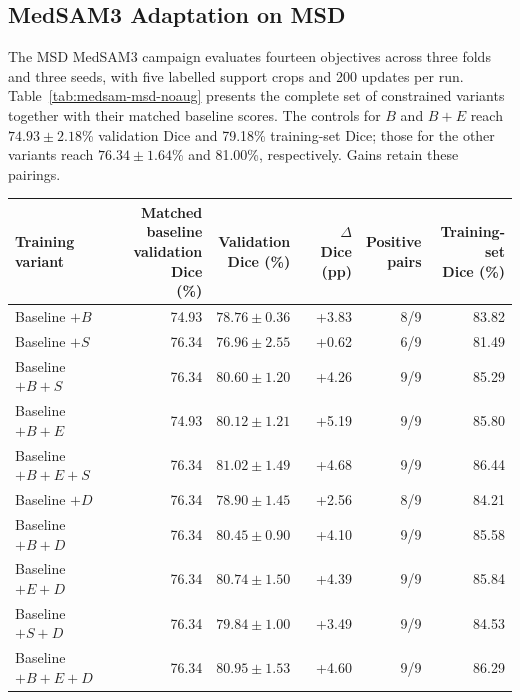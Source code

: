 \documentclass[12pt,a4paper]{article}
\begin{document}
\FloatBarrier
\subsection{MedSAM3 Adaptation on MSD}
\label{sec:medsam-results}

The MSD MedSAM3 campaign evaluates fourteen objectives across three
folds and three seeds, with five labelled support crops and 200 updates
per run. Table~\ref{tab:medsam-msd-noaug} presents the complete set of
constrained variants together with their matched baseline scores.
The controls for $B$ and $B+E$ reach $74.93\pm2.18$\% validation Dice
and 79.18\% training-set Dice; those for the other variants reach
$76.34\pm1.64$\% and 81.00\%, respectively. Gains retain these pairings.

\begin{table}[htbp]
\centering\footnotesize{}
\setlength{\tabcolsep}{4pt}
\renewcommand{\arraystretch}{1.15}
\begin{tabular}{@{}lrrrrr@{}}
\hline
\shortstack{Training\\variant} & \shortstack{Matched baseline\\validation Dice\\(\%)} & \shortstack{Validation\\Dice (\%)} & \shortstack{$\Delta$ Dice\\(pp)} & \shortstack{Positive\\pairs} & \shortstack{Training-set\\Dice (\%)} \\
\hline
Baseline $+B$ & 74.93 & $78.76\pm0.36$ & +3.83 & 8/9 & 83.82 \\
Baseline $+S$ & 76.34 & $76.96\pm2.55$ & +0.62 & 6/9 & 81.49 \\
Baseline $+B+S$ & 76.34 & $80.60\pm1.20$ & +4.26 & 9/9 & 85.29 \\
Baseline $+B+E$ & 74.93 & $80.12\pm1.21$ & +5.19 & 9/9 & 85.80 \\
Baseline $+B+E+S$ & 76.34 & $81.02\pm1.49$ & +4.68 & 9/9 & 86.44 \\
Baseline $+D$ & 76.34 & $78.90\pm1.45$ & +2.56 & 8/9 & 84.21 \\
Baseline $+B+D$ & 76.34 & $80.45\pm0.90$ & +4.10 & 9/9 & 85.58 \\
Baseline $+E+D$ & 76.34 & $80.74\pm1.50$ & +4.39 & 9/9 & 85.84 \\
Baseline $+S+D$ & 76.34 & $79.84\pm1.00$ & +3.49 & 9/9 & 84.53 \\
Baseline $+B+E+D$ & 76.34 & $80.95\pm1.53$ & +4.60 & 9/9 & 86.29 \\

\end{tabular}
\end{table}
\end{document}
